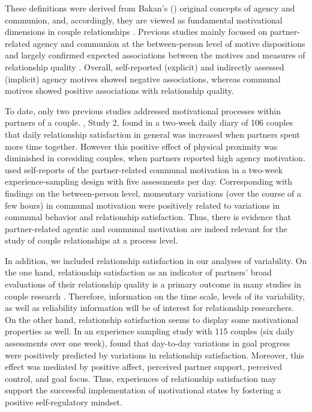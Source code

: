 \documentclass[jou,a4paper,draftfirst]{apa6}\usepackage[]{graphicx}\usepackage[]{color}
\begin{document}
These definitions were derived from Bakan’s (\citeyear{bakan_duality_1966}) original concepts of agency and communion, and, accordingly, they are viewed as fundamental motivational dimensions in couple relationships \parencite{hagemeyer_AssessingImplicitMotivational_2012,hagemeyer_abc_2013}.
Previous studies mainly focused on partner-related agency and communion at the between-person level of motive dispositions and largely confirmed expected associations between the motives and measures of relationship quality \parencite{hagemeyer_congruence_2013,hagemeyer_AssessingImplicitMotivational_2012,hagemeyer_abc_2013,hagemeyerWhenTogetherMeans2015}.
Overall, self-reported (explicit) and indirectly assessed (implicit) agency motives showed negative associations, whereas communal motives showed positive associations with relationship quality. 

To date, only two previous studies addressed motivational processes within partners of a couple. \textcite{hagemeyerWhenTogetherMeans2015}, Study 2, found in a two-week daily diary of 106 couples that daily relationship satisfaction in general was increased when partners spent more time together. However this positive effect of physical proximity was diminished in coresiding couples, when partners reported high agency motivation. \textcite{zygar_MotiveDispositionsStates_2018} used self-reports of the partner-related communal motivation in a two-week experience-sampling design with five assessments per day. Corresponding with findings on the between-person level, momentary variations (over the course of a few hours) in communal motivation were positively related to variations in communal behavior and relationship satisfaction. Thus, there is evidence that partner-related agentic and communal motivation are indeed relevant for the study of couple relationships at a process level.

In addition, we included relationship satisfaction in our analyses of variability. On the one hand, relationship satisfaction as an indicator of partners’ broad evaluations of their relationship quality is a primary outcome in many studies in couple research \parencite{karney_longitudinal_1995}. Therefore, information on the time scale, levels of its variability, as well as reliability information will be of interest for relationship researchers.  On the other hand, relationship satisfaction seems to display some motivational properties as well. In an experience sampling study with 115 couples (six daily assessments over one week), \textcite{hofmann_CloseRelationshipsSelfregulation_2015} found that day-to-day variations in goal progress were positively predicted by variations in relationship satisfaction. Moreover, this effect was mediated by positive affect, perceived partner support, perceived control, and goal focus. Thus, experiences of relationship satisfaction may support the successful implementation of motivational states by fostering a positive self-regulatory mindset.
\end{document}
